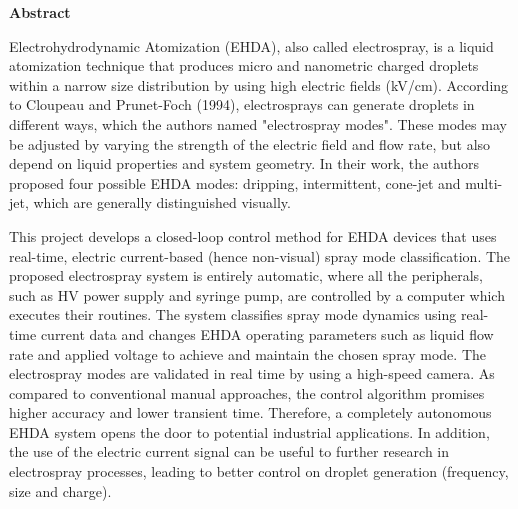 
\begin{center}
\huge{{\bf Abstract}}
\vspace{2cm}
\end{center}

    Electrohydrodynamic Atomization (EHDA), also called electrospray, is a liquid atomization technique that
    produces micro and nanometric charged droplets within a narrow size distribution by using high electric fields (kV/cm).
    According to Cloupeau and Prunet-Foch\cite{prunet} (1994), electrosprays can generate droplets in different ways, which the authors
    named "electrospray modes". These modes may be adjusted by varying the strength of the electric field and flow rate,
    but also depend on liquid properties and system geometry. In their work, the authors proposed four possible EHDA
    modes: dripping, intermittent, cone-jet and multi-jet, which are generally distinguished visually.
    
    This project develops a closed-loop control method for EHDA devices that uses real-time, electric current-based (hence
    non-visual) spray mode classification.
    The proposed electrospray system is entirely automatic, where all the peripherals, such as HV power supply and syringe
    pump, are controlled by a computer which executes their routines.
    The system classifies spray mode dynamics using real-time current data and changes EHDA operating parameters such
    as liquid flow rate and applied voltage to achieve and maintain the chosen spray mode. The electrospray modes are
    validated in real time by using a high-speed camera.
    As compared to conventional manual approaches, the control algorithm promises higher
    accuracy and lower transient time. Therefore, a completely autonomous EHDA system opens the door to potential
    industrial applications. In addition, the use of the electric current signal can be useful to further research in electrospray
    processes, leading to better control on droplet generation (frequency, size and charge).
 
